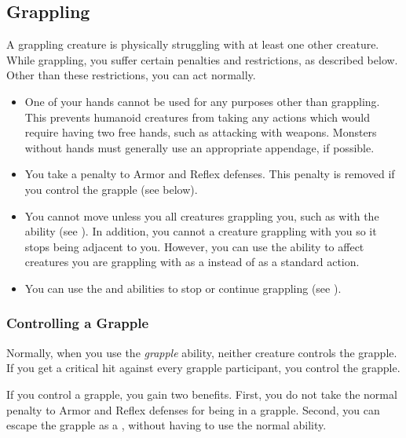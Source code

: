   \subsection{Grappling}\label{Grappling}
    A grappling creature is physically struggling with at least one other creature.
    While grappling, you suffer certain penalties and restrictions, as described below.
    Other than these restrictions, you can act normally.
    \begin{itemize}
      \item One of your hands cannot be used for any purposes other than grappling.
        This prevents humanoid creatures from taking any actions which would require having two free hands, such as attacking with  weapons.
        Monsters without hands must generally use an appropriate appendage, if possible.
      \item You take a  penalty to Armor and Reflex defenses.
        This penalty is removed if you control the grapple (see below).
      \item You cannot move unless you  all creatures grappling you, such as with the  ability (see ).
        In addition, you cannot  a creature grappling with you so it stops being adjacent to you.
        However, you can use the  ability to affect creatures you are grappling with as a  instead of as a standard action.
      \item You can use the  and  abilities to stop or continue grappling (see ).
    \end{itemize}

    \subsubsection{Controlling a Grapple}\label{Controlling a Grapple}
      Normally, when you use the \textit{grapple} ability, neither creature controls the grapple.
      If you get a critical hit against every grapple participant, you control the grapple.

      If you control a grapple, you gain two benefits.
      First, you do not take the normal  penalty to Armor and Reflex defenses for being in a grapple.
      Second, you can escape the grapple as a , without having to use the normal  ability.

